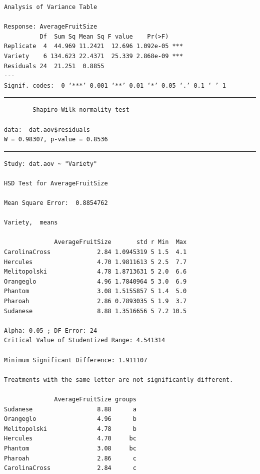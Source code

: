 \documentclass[a4paper, 10pt, fleqn, twosided]{memoir}
\begin{document}
\begin{tcolorbox}[title = Exercise 3 output continued]
\begin{verbatim}
Analysis of Variance Table

Response: AverageFruitSize
          Df  Sum Sq Mean Sq F value    Pr(>F)
Replicate  4  44.969 11.2421  12.696 1.092e-05 ***
Variety    6 134.623 22.4371  25.339 2.868e-09 ***
Residuals 24  21.251  0.8855
---
Signif. codes:  0 ‘***’ 0.001 ‘**’ 0.01 ‘*’ 0.05 ‘.’ 0.1 ‘ ’ 1
\end{verbatim}
{\color{outpt} {\hrule height 1pt}}
\begin{verbatim}
        Shapiro-Wilk normality test

data:  dat.aov$residuals
W = 0.98307, p-value = 0.8536
\end{verbatim}
{\color{outpt} {\hrule height 1pt}}
\begin{verbatim}
Study: dat.aov ~ "Variety"

HSD Test for AverageFruitSize

Mean Square Error:  0.8854762

Variety,  means

              AverageFruitSize       std r Min  Max
CarolinaCross             2.84 1.0945319 5 1.5  4.1
Hercules                  4.70 1.9811613 5 2.5  7.7
Melitopolski              4.78 1.8713631 5 2.0  6.6
Orangeglo                 4.96 1.7840964 5 3.0  6.9
Phantom                   3.08 1.5155857 5 1.4  5.0
Pharoah                   2.86 0.7893035 5 1.9  3.7
Sudanese                  8.88 1.3516656 5 7.2 10.5

Alpha: 0.05 ; DF Error: 24
Critical Value of Studentized Range: 4.541314

Minimum Significant Difference: 1.911107

Treatments with the same letter are not significantly different.

              AverageFruitSize groups
Sudanese                  8.88      a
Orangeglo                 4.96      b
Melitopolski              4.78      b
Hercules                  4.70     bc
Phantom                   3.08     bc
Pharoah                   2.86      c
CarolinaCross             2.84      c
\end{verbatim}
\end{tcolorbox}
\end{document}

